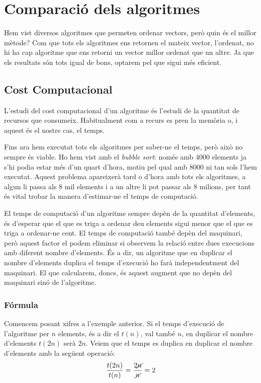 \chapter{Comparació dels algoritmes}
Hem vist diversos algoritmes que permeten ordenar vectors, però quin és el millor mètode?
Com que tots els algoritmes ens retornen el mateix vector, l'ordenat, no hi ha cap algoritme que ens retorni un vector millor ordenat que un altre. Ja que els resultats són tots igual de bons, optarem pel que sigui més eficient.

\section{Cost Computacional}
L'estudi del cost computacional d'un algoritme és l'estudi de la quantitat de recursos que consumeix. Habitualment com a recurs es pren la memòria o, i aquest és el nostre cas, el temps.

Fins ara hem executat tots els algoritmes per saber-ne el temps, però això no sempre és viable.
Ho hem vist amb el \textit{bubble sort}: només amb 4000 elements ja s'hi podia estar més d'un quart d'hora, motiu pel qual amb 8000 ni tan sols l'hem executat.
Aquest problema apareixerà tard o d'hora amb tots els algoritmes, a algun li passa als 8 mil elements i a un altre li pot passar als 8 milions, per tant és vital trobar la manera d'estimar-ne el temps de computació.

El temps de computació d'un algoritme sempre depèn de la quantitat d'elements, és d'esperar que el que es triga a ordenar deu elements sigui menor que el que es triga a ordenar-ne cent.
El temps de computació també depèn del maquinari, però aquest factor el podem eliminar si observem la relació entre dues execucions amb diferent nombre d'elements.
És a dir, un algoritme que en duplicar el nombre d'elements duplica el temps d'execució ho farà independentment del maquinari.
El que calcularem, doncs, és aquest augment que no depèn del maquinari sinó de l'algoritme.

\subsection{Fórmula}
Comencem posant xifres a l'exemple anterior.
Si el temps d'execució de l'algoritme per $n$ elements, és a dir el $t(n)$, val també $n$, en duplicar el nombre d'elements $t(2n)$ serà $2n$.
Veiem que el temps es duplica en duplicar el nombre d'elements amb la següent operació:
\begin{gather*}
	\frac{t(2n)}{t(n)} = \frac{2 \cancel{n}}{ \cancel{n}} = 2
\end{gather*}

